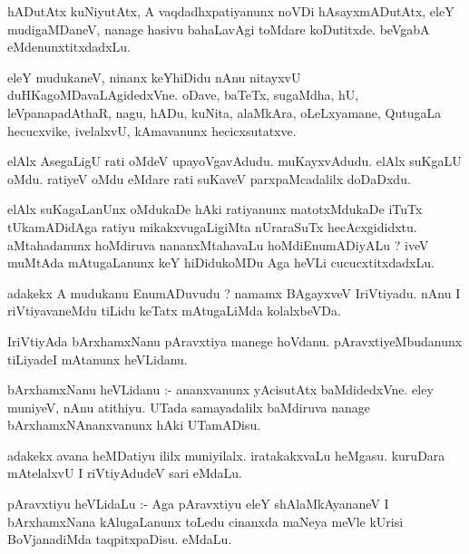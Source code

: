 \documentclass{article}
\begin{document}
\begin{mn}
hADutAtx  kuNiyutAtx,  A  vaqdadhxpatiyanunx  noVDi  hAsayxmADutAtx,  eleY  mudigaMDaneV,  nanage  
hasivu  bahaLavAgi  toMdare koDutitxde.  beVgabA  eMdenunxtitxdadxLu.
\end{mn}

\begin{mn}
eleY  mudukaneV,  ninanx  keYhiDidu  nAnu  nitayxvU  duHKagoMDavaLAgidedxVne.  oDave,  baTeTx,  sugaMdha,  hU,  leVpanapadAthaR,  
nagu,  hADu,  kuNita,  alaMkAra,  oLeLxyamane,  QutugaLa  hecucxvike,  ivelalxvU,  kAmavanunx  hecicxsutatxve.
\end{mn}

\begin{mn}
elAlx  AsegaLigU  rati  oMdeV  upayoVgavAdudu.  muKayxvAdudu.  elAlx  suKgaLU  oMdu.  ratiyeV  oMdu  
eMdare  rati  suKaveV  parxpaMcadalilx  doDaDxdu.
\end{mn}

\begin{mn}
elAlx  suKagaLanUnx  oMdukaDe  hAki  ratiyanunx  matotxMdukaDe  iTuTx  tUkamADidAga  ratiyu  mikakxvugaLigiMta  
nUraraSuTx  hecAcxgididxtu.  aMtahadanunx  hoMdiruva  nananxMtahavaLu  hoMdiEnumADiyALu ?  iveV  muMtAda  
mAtugaLanunx  keY  hiDidukoMDu  Aga  heVLi  cucucxtitxdadxLu.
\end{mn}

\begin{mn}
adakekx  A  mudukanu  EnumADuvudu ?  namamx  BAgayxveV  IriVtiyadu.  nAnu  I riVtiyavaneMdu  tiLidu  
keTatx mAtugaLiMda  kolalxbeVDa.
\end{mn}

\begin{mn}
IriVtiyAda  bArxhamxNanu  pAravxtiya  manege  hoVdanu.  pAravxtiyeMbudanunx  tiLiyadeI  mAtanunx  heVLidanu.
\end{mn}

\begin{mn}
bArxhamxNanu  heVLidanu :- ananxvanunx  yAcisutAtx  baMdidedxVne.  eley  muniyeV,  nAnu  atithiyu.  
UTada  samayadalilx  baMdiruva  nanage  bArxhamxNAnanxvanunx  hAki  UTamADisu.
\end{mn}

\begin{mn}
adakekx  avana  heMDatiyu  ililx  muniyilalx.  iratakakxvaLu  heMgasu.  kuruDara  mAtelalxvU  I  
riVtiyAdudeV  sari  eMdaLu.
\end{mn}

\begin{mn}
pAravxtiyu  heVLidaLu :- Aga  pAravxtiyu  eleY  shAlaMkAyananeV  I  bArxhamxNana  kAlugaLanunx  toLedu  
cinanxda  maNeya  meVle  kUrisi  BoVjanadiMda  taqpitxpaDisu.  eMdaLu.
\end{mn}
\end{document}

